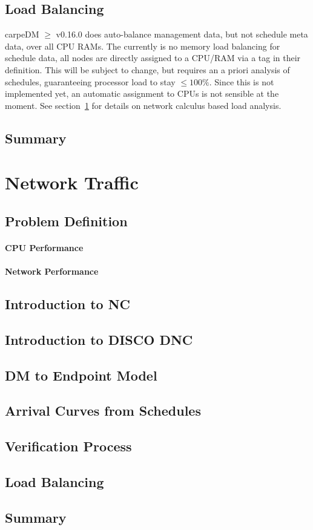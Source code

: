 \subsection{Load Balancing}
carpeDM $\ge$ v0.16.0 does auto-balance management data, but not schedule meta data, over all CPU RAMs.
The currently is no memory load balancing for schedule data, all nodes are directly assigned to a CPU/RAM via a tag in their definition.
This will be subject to change, but requires an a priori analysis of schedules, guaranteeing processor load to stay $\le100\%$. Since this is not implemented yet, an automatic assignment to CPUs is not sensible at the moment. See section~\ref{sec:nettraffic} for details on network calculus based load analysis.

\subsection{Summary}



\section{Network Traffic}
\label{sec:nettraffic}

\subsection{Problem Definition}

\paragraph{CPU Performance}

\paragraph{Network Performance}

\subsection{Introduction to NC}

\subsection{Introduction to DISCO DNC}

\subsection{DM to Endpoint Model}

\subsection{Arrival Curves from Schedules}

\subsection{Verification Process}

\subsection{Load Balancing}
\label{ssec:ncloadbalance}

\subsection{Summary}

